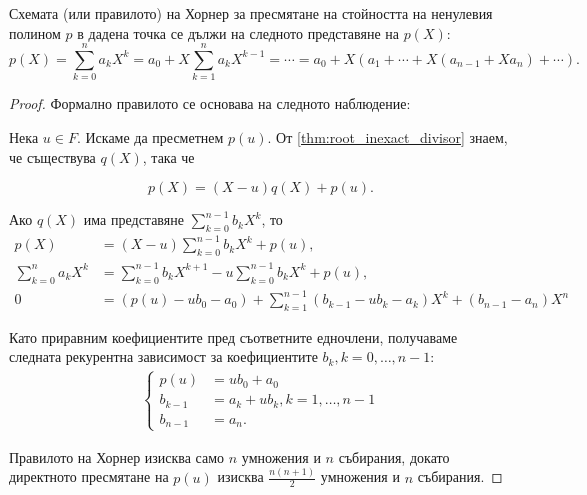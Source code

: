 \documentclass{../../common/topic}
\begin{document}
\begin{proposition}
  Схемата (или правилото) на Хорнер за пресмятане на стойността на ненулевия полином \( p \) в дадена точка се дължи на следното представяне на \( p(X) \):
  \begin{equation*}
    p(X) = \sum_{k=0}^n a_k X^k = a_0 + X \sum_{k=1}^n a_k X^{k-1} = \cdots = a_0 + X (a_1 + \cdots + X(a_{n-1} + X a_n) + \cdots).
  \end{equation*}
\end{proposition}
\begin{proof}
  Формално правилото се основава на следното наблюдение:

  Нека \( u \in F \). Искаме да пресметнем \( p(u) \). От \cref{thm:root_inexact_divisor} знаем, че съществува \( q(X) \), така че

  \begin{equation*}
    p(X) = (X - u) q(X) + p(u).
  \end{equation*}

  Ако \( q(X) \) има представяне \( \sum_{k=0}^{n-1} b_k X^k \), то
  \begin{align*}
    p(X)
    &=
    (X - u) \sum_{k=0}^{n-1} b_k X^k + p(u),
    \\
    \sum_{k=0}^n a_k X^k
    &=
    \sum_{k=0}^{n-1} b_k X^{k+1} - u \sum_{k=0}^{n-1} b_k X^k + p(u),
    \\
    0
    &=
    (p(u) - u b_0 - a_0) + \sum_{k=1}^{n-1} (b_{k-1} - u b_k - a_k) X^k + (b_{n-1} - a_n) X^n
  \end{align*}

  Като приравним коефициентите пред съответните едночлени, получаваме следната рекурентна зависимост за коефициентите \( b_k, k = 0, \ldots, n - 1 \):
  \begin{align*}
    \begin{cases}
      p(u) &= u b_0 + a_0 \\
      b_{k-1} &= a_k + u b_k, k = 1, \ldots, n - 1 \\
      b_{n-1} &= a_n.
    \end{cases}
  \end{align*}

  Правилото на Хорнер изисква само \( n \) умножения и \( n \) събирания, докато директното пресмятане на \( p(u) \) изисква \( \frac {n(n+1)} 2 \) умножения и \( n \) събирания.
\end{proof}
\end{document}
